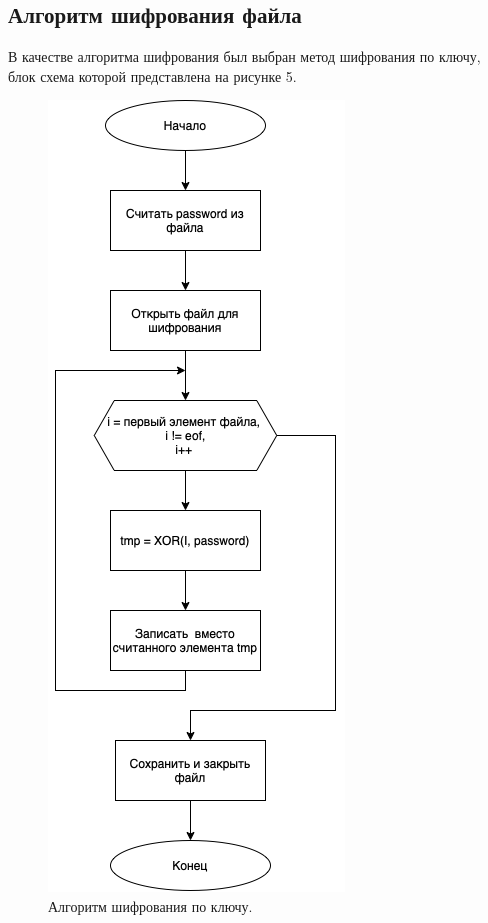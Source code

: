 \documentclass[a4paper, 10pt]{article}
\begin{document}
	\subsection{Алгоритм шифрования файла}
	В качестве алгоритма шифрования был выбран метод шифрования по ключу, блок схема которой представлена на рисунке 5.
	\clearpage
	\newpage
	\begin{figure}[t!]
		\centering
		\includegraphics[scale=0.43]{shifr}
		\centering\caption{Алгоритм шифрования по ключу.}
	\end{figure}
\end{document}
